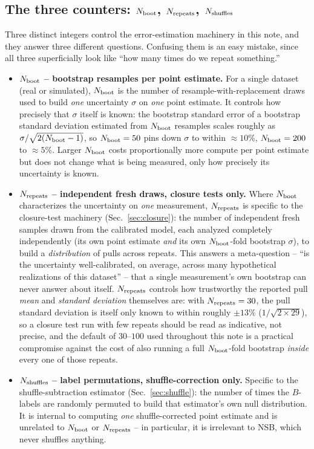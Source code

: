 \documentclass[11pt]{article}
\begin{document}
\subsection{The three counters: $N_{\rm boot}$, $N_{\rm repeats}$,
$N_{\rm shuffles}$}
\label{sec:errors-counters}

Three distinct integers control the error-estimation machinery in this
note, and they answer three different questions. Confusing them is an
easy mistake, since all three superficially look like ``how many times do
we repeat something.''

\begin{itemize}
\item \textbf{$N_{\rm boot}$ -- bootstrap resamples per point estimate.}
For a single dataset (real or simulated), $N_{\rm boot}$ is the number of
resample-with-replacement draws used to build \emph{one} uncertainty
$\sigma$ on \emph{one} point estimate. It controls how precisely that
$\sigma$ itself is known: the bootstrap standard error of a bootstrap
standard deviation estimated from $N_{\rm boot}$ resamples scales
roughly as $\sigma/\sqrt{2(N_{\rm boot}-1)}$, so $N_{\rm boot}=50$ pins
down $\sigma$ to within $\approx10\%$, $N_{\rm boot}=200$ to
$\approx5\%$. Larger $N_{\rm boot}$ costs proportionally more compute
per point estimate but does not change what is being measured, only how
precisely its uncertainty is known.
\item \textbf{$N_{\rm repeats}$ -- independent fresh draws, closure tests
only.} Where $N_{\rm boot}$ characterizes the uncertainty on \emph{one}
measurement, $N_{\rm repeats}$ is specific to the closure-test machinery
(Sec.~\ref{sec:closure}): the number of independent fresh samples drawn
from the calibrated model, each analyzed completely independently
(its own point estimate \emph{and} its own $N_{\rm boot}$-fold bootstrap
$\sigma$), to build a \emph{distribution} of pulls across repeats. This
answers a meta-question -- ``is the uncertainty well-calibrated, on
average, across many hypothetical realizations of this dataset'' -- that
a single measurement's own bootstrap can never answer about itself.
$N_{\rm repeats}$ controls how trustworthy the reported pull \emph{mean}
and \emph{standard deviation} themselves are: with $N_{\rm repeats}=30$,
the pull standard deviation is itself only known to within roughly
$\pm13\%$ ($1/\sqrt{2\times29}$), so a closure test run with few repeats
should be read as indicative, not precise, and the default of $30$--$100$
used throughout this note is a practical compromise against the cost of
also running a full $N_{\rm boot}$-fold bootstrap \emph{inside} every one
of those repeats.
\item \textbf{$N_{\rm shuffles}$ -- label permutations, shuffle-correction
only.} Specific to the shuffle-subtraction estimator
(Sec.~\ref{sec:shuffle}): the number of times the $B$-labels are randomly
permuted to build that estimator's own null distribution. It is internal
to computing \emph{one} shuffle-corrected point estimate and is
unrelated to $N_{\rm boot}$ or $N_{\rm repeats}$ -- in particular, it is
irrelevant to NSB, which never shuffles anything.
\end{itemize}
\end{document}
